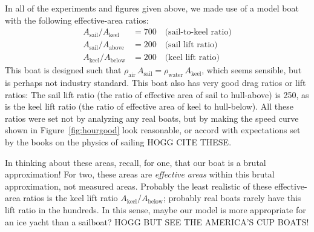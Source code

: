 \documentclass[letterpaper]{article}
\newcommand{\air}{\text{air}}
\newcommand{\water}{\text{water}}
\newcommand{\sail}{\text{sail}}
\newcommand{\keel}{\text{keel}}
\renewcommand{\above}{\text{above}}
\newcommand{\below}{\text{below}}
\newcommand{\figref}[1]{Figure~\ref{#1}}
\begin{document}
In all of the experiments and figures given above, we made use of a model boat with the following effective-area ratios:
\begin{align}
  A_\sail / A_\keel &= 700 \quad\mbox{(sail-to-keel ratio)}\label{eq:boat1}\\
  A_\sail / A_\above &= 200 \quad\mbox{(sail lift ratio)}\\
  A_\keel / A_\below &= 200 \quad\mbox{(keel lift ratio)}\label{eq:boat4}
\end{align}
This boat is designed such that $\rho_\air\,A_\sail = \rho_\water\,A_\keel$, which seems sensible, but is perhaps not industry standard.
This boat also has very good drag ratios or lift ratios:
The sail lift ratio (the ratio of effective area of sail to hull-above) is 250, as is the keel lift ratio (the ratio of effective area of keel to hull-below).
All these ratios were set not by analyzing any real boats, but by making the speed curve shown in \figref{fig:hourgood} look reasonable, or accord with expectations set by the books on the physics of sailing HOGG CITE THESE.

In thinking about these areas, recall, for one, that our boat is a brutal approximation!
For two, these areas are \emph{effective areas} within this brutal approximation, not measured areas.
Probably the least realistic of these effective-area ratios is the keel lift ratio $A_\keel/A_\below$; probably real boats rarely have this lift ratio in the hundreds.
In this sense, maybe our model is more appropriate for an ice yacht than a sailboat?
HOGG BUT SEE THE AMERICA'S CUP BOATS!
\end{document}
